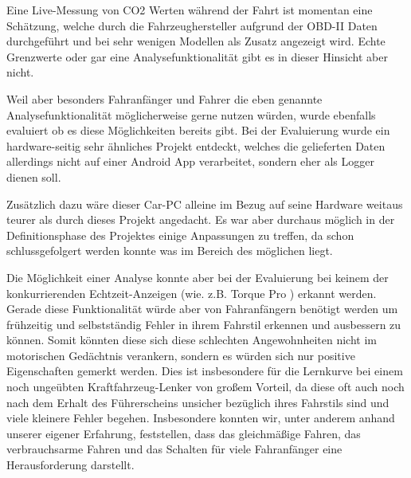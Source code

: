 Eine Live-Messung von CO2 Werten während der Fahrt ist momentan eine Schätzung, welche durch die Fahrzeughersteller aufgrund der OBD-II Daten durchgeführt und bei sehr wenigen Modellen als Zusatz angezeigt wird. Echte Grenzwerte oder gar eine Analysefunktionalität gibt es in dieser Hinsicht aber nicht.

Weil aber besonders Fahranfänger und Fahrer die eben genannte Analysefunktionalität möglicherweise gerne nutzen würden, wurde ebenfalls evaluiert ob es diese Möglichkeiten bereits gibt.
Bei der Evaluierung wurde ein hardware-seitig sehr ähnliches Projekt entdeckt, welches die gelieferten Daten allerdings nicht auf einer Android App verarbeitet, sondern eher als Logger dienen soll.\cite{LowBudget.CarPC} 

Zusätzlich dazu wäre dieser Car-PC alleine im Bezug auf seine Hardware weitaus teurer als durch dieses Projekt angedacht. Es war aber durchaus möglich in der Definitionsphase des Projektes einige Anpassungen zu treffen, da schon schlussgefolgert werden konnte was im Bereich des möglichen liegt. 

Die Möglichkeit einer Analyse konnte aber bei der Evaluierung bei keinem der konkurrierenden Echtzeit-Anzeigen (wie. z.B. Torque Pro \cite{Torque.Pro}) erkannt werden. Gerade diese Funktionalität würde aber von Fahranfängern benötigt werden um frühzeitig und selbstständig Fehler in ihrem Fahrstil erkennen und ausbessern zu können. Somit könnten diese sich diese schlechten Angewohnheiten nicht im motorischen Gedächtnis verankern, sondern es würden sich nur positive Eigenschaften gemerkt werden. Dies ist insbesondere für die Lernkurve bei einem noch ungeübten Kraftfahrzeug-Lenker von großem Vorteil, da diese oft auch noch nach dem Erhalt des Führerscheins unsicher bezüglich ihres Fahrstils sind und viele kleinere Fehler begehen. Insbesondere konnten wir, unter anderem anhand unserer eigener Erfahrung, feststellen, dass das gleichmäßige Fahren, das verbrauchsarme Fahren und das Schalten für viele Fahranfänger eine Herausforderung darstellt.

\clearpage %
